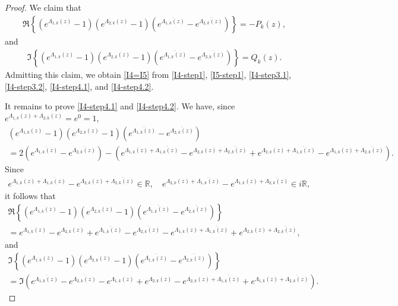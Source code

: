 \documentclass[11pt, reqno]{amsart}
\theoremstyle{plain}
\numberwithin{equation}{section}
\newcommand{\mR}{\mathbb{R}}
\begin{document}
\begin{proof}
We claim that    
\begin{align}	\label{I4-step4.1} 
  \Re \left\{ \left(e^{\Lambda_{1,k}(z)} - 1 \right) \left(e^{\Lambda_{2,k}(z)} - 1 \right) \left(e^{\overline{\Lambda_{1,k}(z)}} - e^{\overline{\Lambda_{2,k}(z)}} \right) \right\} = - P_k(z), 
\end{align}     
and	
\begin{align}	\label{I4-step4.2}
\Im \left\{ \left(e^{\Lambda_{1,k}(z)} - 1 \right) \left(e^{\Lambda_{2,k}(z)} - 1 \right) \left(e^{\overline{\Lambda_{1,k}(z)}} - e^{\overline{\Lambda_{2,k}(z)}} \right)  \right\} = Q_k(z).
\end{align}
Admitting this claim, we obtain \eqref{I4=I5} from \eqref{I4-step1}, \eqref{I5-step1}, \eqref{I4-step3.1}, \eqref{I4-step3.2}, \eqref{I4-step4.1}, and \eqref{I4-step4.2}.

\medskip

    It remains to prove \eqref{I4-step4.1} and \eqref{I4-step4.2}. We have, since $e^{\Lambda_{1,k}(z) + \Lambda_{2,k}(z)} = e^0 = 1$, 
    \begin{multline*}
         \left(e^{\Lambda_{1,k}(z)} - 1 \right) \left(e^{\Lambda_{2,k}(z)} - 1 \right) \left(e^{\overline{\Lambda_{1,k}(z)}} - e^{\overline{\Lambda_{2,k}(z)}} \right) \\
        = 2 \left(e^{\overline{\Lambda_{1,k}(z)}} - e^{\overline{\Lambda_{2,k}(z)}} \right) - \left(e^{\Lambda_{1,k}(z) + \overline{\Lambda_{1,k}(z)}} - e^{\Lambda_{2,k}(z) + \overline{\Lambda_{2,k}(z)}} + e^{\Lambda_{2,k}(z) + \overline{\Lambda_{1,k}(z)}} - e^{\Lambda_{1,k}(z) + \overline{\Lambda_{2,k}(z)}}\right). 
    \end{multline*}
Since
    \begin{align*}
    	e^{\Lambda_{1,k}(z) + \overline{\Lambda_{1,k}(z)}} - e^{\Lambda_{2,k}(z) + \overline{\Lambda_{2,k}(z)}}  \in \mR, \quad  e^{\Lambda_{2,k}(z) + \overline{\Lambda_{1,k}(z)}} - e^{\Lambda_{1,k}(z) + \overline{\Lambda_{2,k}(z)}} \in i \mR, 
    \end{align*}
it follows that
\begin{multline}\label{I4I5-p1}
        \Re \left\{ \left(e^{\Lambda_{1,k}(z)} - 1 \right) \left(e^{\Lambda_{2,k}(z)} - 1 \right) \left(e^{\overline{\Lambda_{1,k}(z)}} - e^{\overline{\Lambda_{2,k}(z)}} \right) \right\} \\ = e^{\Lambda_{1,k}(z)} - e^{\Lambda_{2,k}(z)} + e^{\overline{\Lambda_{1,k}(z)}} - e^{\overline{\Lambda_{2,k}(z)}}  - e^{\Lambda_{1,k}(z) + \overline{\Lambda_{1,k}(z)}} + e^{\Lambda_{2,k}(z) + \overline{\Lambda_{2,k}(z)}},  
    \end{multline}
    and
    \begin{multline}\label{I4I5-p2}
          \Im \left\{ \left(e^{\Lambda_{1,k}(z)} - 1 \right) \left(e^{\Lambda_{2,k}(z)} - 1 \right) \left(e^{\overline{\Lambda_{1,k}(z)}} - e^{\overline{\Lambda_{2,k}(z)}} \right)  \right\} \\[6pt]
          = \Im \left( e^{\overline{\Lambda_{1,k}(z)}} - e^{\overline{\Lambda_{2,k}(z)}} - e^{\Lambda_{1,k}(z)} + e^{\Lambda_{2,k}(z)} - e^{\Lambda_{2,k}(z) + \overline{\Lambda_{1,k}(z)}} + e^{\Lambda_{1,k}(z) + \overline{\Lambda_{2,k}(z)}} \right). 
    \end{multline}  
    

\end{proof}
\end{document}
